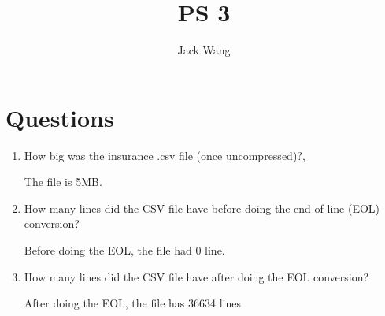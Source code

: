\documentclass{article}
\title{PS 3}
\author{Jack Wang}
\begin{document}
\maketitle


\section{Questions}

\begin{enumerate}
\item How big was the insurance .csv file (once uncompressed)?,

The file is 5MB.

\item How many lines did the CSV file have before doing the end-of-line (EOL) conversion?

Before doing the EOL, the file had 0 line.

\item How many lines did the CSV file have after doing the EOL conversion?

After doing the EOL, the file has 36634 lines

\end{enumerate}
\end{document}

